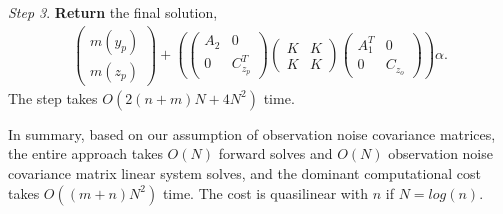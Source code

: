 \documentclass[article,ij4uq]{ij4uq}              %
\begin{document}
\begin{algorithm}[!t]
\textit{Step 3}. \textbf{Return} the final solution,
\begin{align}
    \begin{pmatrix}m(y_{p})\\m(z_{p})\end{pmatrix}+\left(\begin{pmatrix}A_{2}&0\\0&C_{z_{p}}^{T}\end{pmatrix}\begin{pmatrix}K&K\\K&K\end{pmatrix}\begin{pmatrix}A_{1}^{T}&0\\0&C_{z_{o}}\end{pmatrix}\right)\alpha.\label{eq28}
\end{align}
The step takes $O(2(n+m)N+4N^{2})$ time.
\end{algorithm}

\par In summary, based on our assumption of observation noise covariance matrices, the entire approach takes $O(N)$ forward solves and $O(N)$ observation noise covariance matrix linear system solves, and the dominant computational cost takes $O((m+n)N^{2})$ time. The cost is quasilinear with $n$ if $N=log(n)$. 
\end{document}
